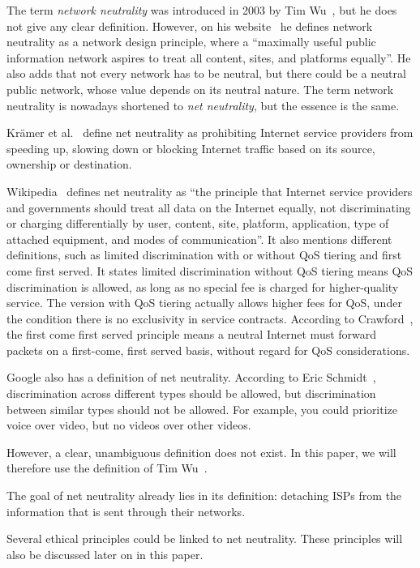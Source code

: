 
The term \emph{network neutrality} was introduced in 2003 by Tim Wu~\cite{wu2003network}, but he does not give any clear definition. However, on his website~\cite{wu2014network} he defines network neutrality as a network design principle, where a ``maximally useful public information network aspires to treat all content, sites, and platforms equally''. He also adds that not every network has to be neutral, but there could be a neutral public network, whose value depends on its neutral nature. The term network neutrality is nowadays shortened to \emph{net neutrality}, but the essence is the same.

Kr\"amer et al.~\cite{kramer2013net} define net neutrality as prohibiting Internet service providers from speeding up, slowing down or blocking Internet traffic based on its source, ownership or destination.

Wikipedia~\cite{wikipedia2014net} defines net neutrality as ``the principle that Internet service providers and governments should treat all data on the Internet equally, not discriminating or charging differentially by user, content, site, platform, application, type of attached equipment, and modes of communication''. It also mentions different definitions, such as limited discrimination with or without \ac{QoS} tiering and first come first served. It states limited discrimination without \ac{QoS} tiering means \ac{QoS} discrimination is allowed, as long as no special fee is charged for higher-quality service. The version with \ac{QoS} tiering actually allows higher fees for \ac{QoS}, under the condition there is no exclusivity in service contracts. According to Crawford~\cite{uhls2007digital}, the first come first served principle means a neutral Internet must forward packets on a first-come, first served basis, without regard for \ac{QoS} considerations.

Google also has a definition of net neutrality. According to Eric Schmidt~\cite{goldman2010why}, discrimination across different types should be allowed, but discrimination between similar types should not be allowed. For example, you could prioritize voice over video, but no videos over other videos.

However, a clear, unambiguous definition does not exist. In this paper, we will therefore use the definition of Tim Wu~\cite{wu2014network}.

The goal of net neutrality already lies in its definition: detaching \acp{ISP} from the information that is sent through their networks.

Several ethical principles could be linked to net neutrality. These principles will also be discussed later on in this paper.

